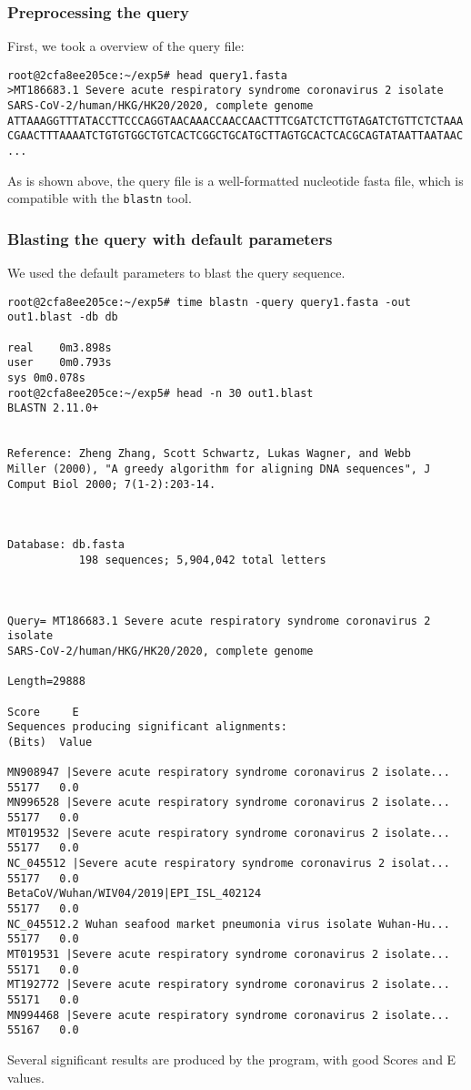 \documentclass[en,black,10pt,normal]{elegantnote}
\newcommand{\upcite}[1]{\textsuperscript{\textsuperscript{\cite{#1}}}}
\begin{document}
\subsubsection{Preprocessing the query}
First, we took a overview of the query file:
\begin{lstlisting}
root@2cfa8ee205ce:~/exp5# head query1.fasta 
>MT186683.1 Severe acute respiratory syndrome coronavirus 2 isolate SARS-CoV-2/human/HKG/HK20/2020, complete genome
ATTAAAGGTTTATACCTTCCCAGGTAACAAACCAACCAACTTTCGATCTCTTGTAGATCTGTTCTCTAAA
CGAACTTTAAAATCTGTGTGGCTGTCACTCGGCTGCATGCTTAGTGCACTCACGCAGTATAATTAATAAC
...
\end{lstlisting}
As is shown above, the query file is a well-formatted nucleotide fasta file,
which is compatible with the \lstinline{blastn} tool.\upcite{zhang2000greedy} 

\subsubsection{Blasting the query with default parameters}
We used the default parameters to blast the query sequence.

\begin{lstlisting}
root@2cfa8ee205ce:~/exp5# time blastn -query query1.fasta -out out1.blast -db db

real	0m3.898s
user	0m0.793s
sys	0m0.078s
root@2cfa8ee205ce:~/exp5# head -n 30 out1.blast 
BLASTN 2.11.0+


Reference: Zheng Zhang, Scott Schwartz, Lukas Wagner, and Webb
Miller (2000), "A greedy algorithm for aligning DNA sequences", J
Comput Biol 2000; 7(1-2):203-14.



Database: db.fasta
           198 sequences; 5,904,042 total letters



Query= MT186683.1 Severe acute respiratory syndrome coronavirus 2 isolate
SARS-CoV-2/human/HKG/HK20/2020, complete genome

Length=29888
                                                                      Score     E
Sequences producing significant alignments:                          (Bits)  Value

MN908947 |Severe acute respiratory syndrome coronavirus 2 isolate...  55177   0.0  
MN996528 |Severe acute respiratory syndrome coronavirus 2 isolate...  55177   0.0  
MT019532 |Severe acute respiratory syndrome coronavirus 2 isolate...  55177   0.0  
NC_045512 |Severe acute respiratory syndrome coronavirus 2 isolat...  55177   0.0  
BetaCoV/Wuhan/WIV04/2019|EPI_ISL_402124                               55177   0.0  
NC_045512.2 Wuhan seafood market pneumonia virus isolate Wuhan-Hu...  55177   0.0  
MT019531 |Severe acute respiratory syndrome coronavirus 2 isolate...  55171   0.0  
MT192772 |Severe acute respiratory syndrome coronavirus 2 isolate...  55171   0.0  
MN994468 |Severe acute respiratory syndrome coronavirus 2 isolate...  55167   0.0  
\end{lstlisting}
Several significant results are produced by the program, with good Scores and E values.
\end{document}
